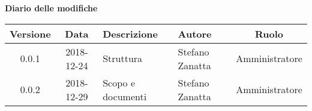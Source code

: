 	\begin{center}
		\textbf{Diario delle modifiche}
	\end{center}
	\begin{center}
		\begin{tabularx}{\textwidth}{|c|c|X|X|c|}
			\hline
			\textbf{Versione} & \textbf{Data} & \textbf{Descrizione} & \textbf{Autore} & \textbf{Ruolo} \\
			\hline
			0.0.1 & 2018-12-24 & Struttura & Stefano Zanatta & Amministratore\\
			0.0.2 & 2018-12-29 & Scopo e documenti & Stefano Zanatta & Amministratore\\
			\hline
		\end{tabularx}
	\end{center}
\newpage